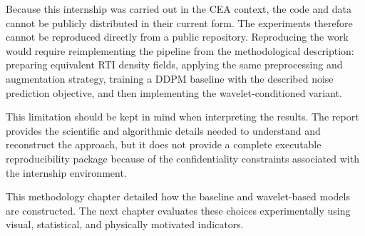Because this internship was carried out in the CEA context, the code and data
cannot be publicly distributed in their current form. The experiments therefore
cannot be reproduced directly from a public repository. Reproducing the work
would require reimplementing the pipeline from the methodological description:
preparing equivalent RTI density fields, applying the same preprocessing and
augmentation strategy, training a DDPM baseline with the described noise
prediction objective, and then implementing the wavelet-conditioned variant.

This limitation should be kept in mind when interpreting the results. The
report provides the scientific and algorithmic details needed to understand and
reconstruct the approach, but it does not provide a complete executable
reproducibility package because of the confidentiality constraints associated
with the internship environment.

This methodology chapter detailed how the baseline and wavelet-based models are constructed. The next chapter evaluates these choices experimentally using visual, statistical, and physically motivated indicators.
